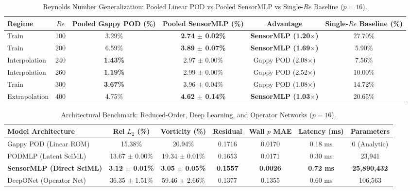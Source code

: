 \begin{table}[h!]
\centering
\caption{Reynolds Number Generalization: Pooled Linear POD vs Pooled SensorMLP vs Single-$Re$ Baseline ($p = 16$).}
\label{tab:reynolds_generalization}
\begin{tabular}{lccccc}
\toprule
\textbf{Regime} & \textbf{$Re$} & \textbf{Pooled Gappy POD (\%)} & \textbf{Pooled SensorMLP (\%)} & \textbf{Advantage} & \textbf{Single-$Re$ Baseline (\%)} \\
\midrule
Train & 100 & 3.29\% & \textbf{2.74 $\pm$ 0.02\%} & \textbf{SensorMLP (1.20$\times$)} & 27.70\% \\
Train & 200 & 6.59\% & \textbf{3.89 $\pm$ 0.07\%} & \textbf{SensorMLP (1.69$\times$)} & 5.90\% \\
Interpolation & 240 & \textbf{1.43\%} & 2.97 $\pm$ 0.00\% & Gappy POD (2.08$\times$) & 7.56\% \\
Interpolation & 260 & \textbf{1.19\%} & 2.99 $\pm$ 0.00\% & Gappy POD (2.52$\times$) & 10.00\% \\
Train & 300 & \textbf{3.67\%} & 3.96 $\pm$ 0.04\% & Gappy POD (1.08$\times$) & 14.72\% \\
Extrapolation & 400 & 4.75\% & \textbf{4.62 $\pm$ 0.14\%} & \textbf{SensorMLP (1.03$\times$)} & 20.65\% \\
\bottomrule
\end{tabular}
\end{table}

\begin{table}[h!]
\centering
\caption{Architectural Benchmark: Reduced-Order, Deep Learning, and Operator Networks ($p = 16$).}
\label{tab:model_comparison_p16}
\begin{tabular}{lcccccc}
\toprule
\textbf{Model Architecture} & \textbf{Rel $L_2$ (\%)} & \textbf{Vorticity (\%)} & \textbf{Residual} & \textbf{Wall $p$ MAE} & \textbf{Latency (ms)} & \textbf{Parameters} \\
\midrule
Gappy POD (Linear ROM) & 15.38\% & 20.94\% & 0.1716 & 0.0170 & 0.18 ms & 0 (Analytic) \\
PODMLP (Latent SciML) & 13.67 $\pm$ 0.00\% & 19.34 $\pm$ 0.01\% & 0.1653 & 0.0171 & 0.30 ms & 23,941 \\
\textbf{SensorMLP (Direct SciML)} & \textbf{3.12 $\pm$ 0.01\%} & \textbf{3.05 $\pm$ 0.05\%} & \textbf{0.1557} & \textbf{0.0026} & \textbf{0.72 ms} & \textbf{25,890,432} \\
DeepONet (Operator Net) & 36.35 $\pm$ 1.51\% & 59.46 $\pm$ 2.66\% & 0.1377 & 0.1355 & 0.60 ms & 106,563 \\
\bottomrule
\end{tabular}
\end{table}

